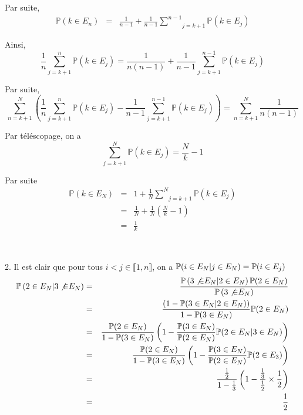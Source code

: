 Par suite,
\begin{eqnarray*}
  \mathbb{P} (k \in E_n) & = & \frac{1}{n - 1} + \frac{1}{n - 1} \underset{j =
  k + 1}{\overset{n - 1}{\sum}} \mathbb{P} (k \in E_j)
\end{eqnarray*}


Ainsi,
\[ \frac{1}{n} \underset{j = k + 1}{\overset{n}{\sum}} \mathbb{P} (k \in E_j)
   = \frac{1}{n (n - 1)} + \frac{1}{n - 1} \underset{j = k + 1}{\overset{n -
   1}{\sum}} \mathbb{P} (k \in E_j) \]


Par suite,
\[ \underset{n = k + 1}{\overset{N}{\sum}} \left( \frac{1}{n} \underset{j = k
   + 1}{\overset{n}{\sum}} \mathbb{P} (k \in E_j) - \frac{1}{n - 1}
   \underset{j = k + 1}{\overset{n - 1}{\sum}} \mathbb{P} (k \in E_j) \right)
   = \underset{n = k + 1}{\overset{N}{\sum}} \frac{1}{n (n - 1)} \]


Par t{\'e}l{\'e}scopage, on a
\[ \underset{j = k + 1}{\overset{N}{\sum}} \mathbb{P} (k \in E_j) =
   \frac{N}{k} - 1 \]


Par suite
\begin{eqnarray*}
  \mathbb{P} (k \in E_N) & = & 1 + \frac{1}{N} \underset{j = k +
  1}{\overset{N}{\sum}} \mathbb{P} (k \in E_j)\\
  & = & \frac{1}{N} + \frac{1}{N} \left( \frac{N}{k} - 1 \right)\\
  & = & \frac{1}{k}
\end{eqnarray*}


\

2. Il est clair que pour tous $i < j \in \llbracket 1, n \rrbracket$, on a
$\mathbb{P} (i \in E_N |  j \in E_N) =\mathbb{P} (i \in E_j)$
\begin{eqnarray*}
  \mathbb{P} \left( 2 \in E_N |  3 \not{\in} E_N \right) & = &
  \frac{\mathbb{P} \left( 3 \not{\in} E_N  |  2 \in E_N \right)
  \mathbb{P} (2 \in E_N)}{\mathbb{P} \left( 3 \not{\in} E_N \right)}\\
  & = & \frac{(1 -\mathbb{P} (3 \in E_N  |  2 \in E_N))}{1
  -\mathbb{P} (3 \in E_N)} \mathbb{P} (2 \in E_N)\\
  & = & \frac{\mathbb{P} (2 \in E_N)}{1 -\mathbb{P} (3 \in E_N)} \left( 1 -
  \frac{\mathbb{P} (3 \in E_N)}{\mathbb{P} (2 \in E_N)} \mathbb{P} (2 \in E_N
  |  3 \in E_N) \right)\\
  & = & \frac{\mathbb{P} (2 \in E_N)}{1 -\mathbb{P} (3 \in E_N)} \left( 1 -
  \frac{\mathbb{P} (3 \in E_N)}{\mathbb{P} (2 \in E_N)} \mathbb{P} (2 \in E_3)
  \right)\\
  & = & \frac{\frac{1}{2}}{1 - \frac{1}{3}} \left( 1 -
  \frac{\frac{1}{3}}{\frac{1}{2}} \times \frac{1}{2} \right)\\
  & = & \frac{1}{2}
\end{eqnarray*}


